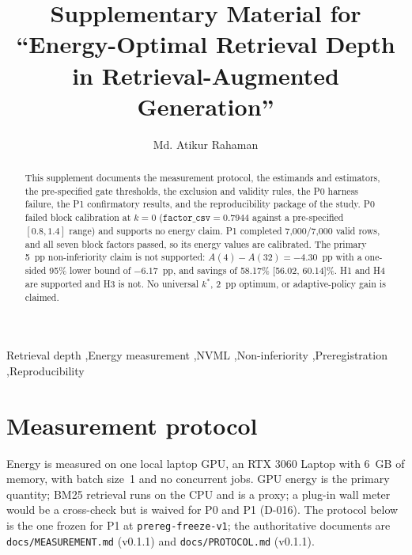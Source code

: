 \documentclass[a4paper,fleqn]{cas-sc}
\begin{document}

\title[mode=title]{Supplementary Material for ``Energy-Optimal Retrieval Depth in Retrieval-Augmented Generation''}

\author[1]{Md. Atikur Rahaman}

\begin{abstract}
This supplement documents the measurement protocol, the estimands and estimators, the
pre-specified gate thresholds, the exclusion and validity rules, the P0 harness failure, the P1
confirmatory results, and the reproducibility package of the study. P0 failed block calibration
at $k=0$ ($\texttt{factor\_csv}=0.7944$ against a pre-specified $[0.8,1.4]$ range) and supports
no energy claim. P1 completed 7{,}000/7{,}000 valid rows, and all seven block factors passed, so
its energy values are calibrated. The primary 5~pp non-inferiority claim is not supported:
$A(4)-A(32)=-4.30$~pp with a one-sided 95\% lower bound of $-6.17$~pp, and savings of 58.17\%
[56.02, 60.14]\%. H1 and H4 are supported and H3 is not. No universal $k^{*}$, 2~pp optimum, or
adaptive-policy gain is claimed.
\end{abstract}

\begin{keywords}
Retrieval depth \sep Energy measurement \sep NVML \sep Non-inferiority \sep Preregistration \sep Reproducibility
\end{keywords}

\begingroup
\hfuzz=120pt
\maketitle
\endgroup

\linenumbers

\section{Measurement protocol}\label{sec:s1}

Energy is measured on one local laptop GPU, an RTX 3060 Laptop with 6~GB of memory, with batch
size~1 and no concurrent jobs. GPU energy is the primary quantity; BM25 retrieval runs on the
CPU and is a proxy; a plug-in wall meter would be a cross-check but is waived for P0 and P1
(D-016). The protocol below is the one frozen for P1 at \texttt{prereg-freeze-v1}; the
authoritative documents are \texttt{docs/MEASUREMENT.md} (v0.1.1) and \texttt{docs/PROTOCOL.md}
(v0.1.1).
\end{document}
